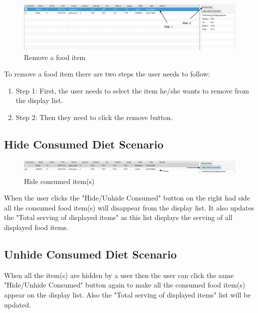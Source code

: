\documentclass{scrreprt}
\begin{document}
\begin{figure}[!htbp]
\centering
\includegraphics[width=15cm]{pictures/remove-food.png}
\caption{Remove a food item}
\end{figure}

\FloatBarrier

To remove a food item there are two steps the user needs to follow:

\begin{enumerate}
\item Step 1: First, the user needs to select the item he/she wants to remove from the display list.
\item Step 2: Then they need to click the remove button.
\end{enumerate}

\subsection{Hide Consumed Diet Scenario}

\begin{figure}[!htbp]
\centering
\includegraphics[width=15cm]{pictures/hide.png}
\caption{Hide consumed item(s)}
\end{figure}

\FloatBarrier

When the user clicks the "Hide/Unhide Consumed" button on the right had side all the consumed food item(s) will disappear from the display list. It also updates the "Total serving of displayed items" as this list displays the serving of all displayed food items.

\subsection{Unhide Consumed Diet Scenario}

When all the item(s) are hidden by a user then the user can click the same "Hide/Unhide Consumed" button again to make all the consumed food item(s) appear on the display list. Also the "Total serving of displayed items" list will be updated.
\end{document}
